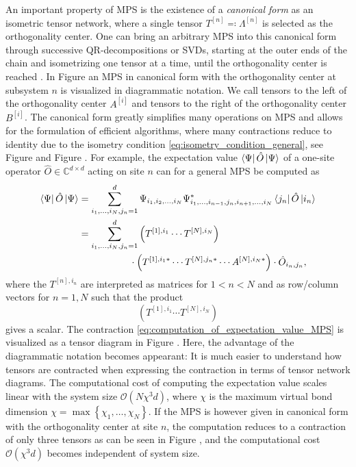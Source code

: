 An important property of MPS is the existence of a \textit{canonical form} as an isometric tensor network, where a single tensor $T^{[n]} \eqqcolon \Lambda^{[n]}$ is selected as the orthogonality center. One can bring an arbitrary MPS into this canonical form through successive QR-decompositions or SVDs, starting at the outer ends of the chain and isometrizing one tensor at a time, until the orthogonality center is reached \cite{cite:DMRG_in_the_age_of_MPS}. In Figure  an MPS in canonical form with the orthogonality center at subsystem $n$ is visualized in diagrammatic notation. We call tensors to the left of the orthogonality center $A^{[i]}$ and tensors to the right of the orthogonality center $B^{[i]}$. The canonical form greatly simplifies many operations on MPS and allows for the formulation of efficient algorithms, where many contractions reduce to identity due to the isometry condition \eqref{eq:isometry_condition_general}, see Figure  and Figure . For example, the expectation value $\bra{\Psi}\hat{O}\ket{\Psi}$ of a one-site operator $\hat{O} \in \mathbb{C}^{d\times d}$ acting on site $n$ can for a general MPS be computed as
\begin{equation}
\begin{split}
	\label{eq:computation_of_expectation_value_MPS}
	\bra{\Psi}\hat{O}\ket{\Psi} &=\sum_{i_1,\dots,i_N,j_n=1}^{d}\Psi_{i_1,i_2,\dots,i_N} \Psi_{i_1,\dots,i_{n-1},j_n,i_{n+1},\dots,i_N}^* \bra{j_n}\hat{O} \ket{i_n} \\
	&= \sum_{i_1,\dots,i_N,j_n=1}^{d} \left(T^{[1],i_1}\cdots T^{[N],i_N}\right) \\
	&\quad\quad\quad\quad\quad\,\,\cdot\left(T^{[1],i_1*}\cdots T^{[N],j_n*} \cdots A^{[N],i_N*}\right)\cdot \hat{O}_{i_n,j_n},
\end{split}
\end{equation}
where the $T^{[n],i_n}$ are interpreted as matrices for $1 < n < N$ and as row/column vectors for $n = 1, N$ such that the product
\begin{equation}
	\left(T^{[1],i_1}\cdots T^{[N],i_N}\right)
\end{equation}
gives a scalar. The contraction \eqref{eq:computation_of_expectation_value_MPS} is visualized as a tensor diagram in Figure . Here, the advantage of the diagrammatic notation becomes appearant: It is much easier to understand how tensors are contracted when expressing the contraction in terms of tensor network diagrams. The computational cost of computing the expectation value scales linear with the system size $\mathcal{O}\left(N\chi^3d\right)$, where $\chi$ is the maximum virtual bond dimension $\chi = \max\left\{\chi_1,\dots,\chi_N\right\}$. If the MPS is however given in canonical form with the orthogonality center at site $n$, the computation reduces to a contraction of only three tensors as can be seen in Figure , and the computational cost $\mathcal{O}\left(\chi^3d\right)$ becomes independent of system size. \par
